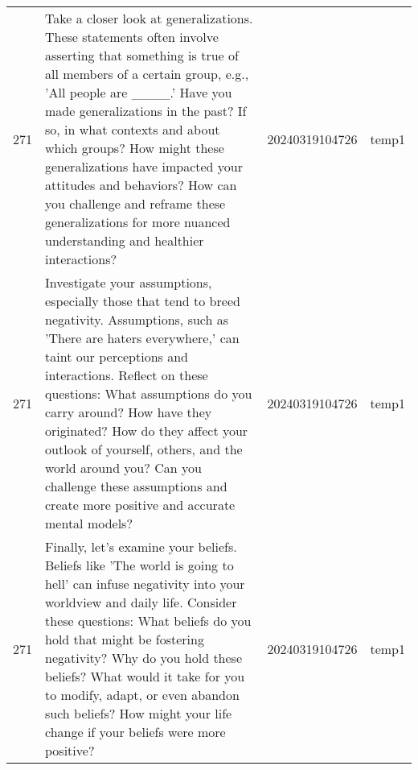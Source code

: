 \begin{longtable}{rlll}
271 &                                                                                                                                                                                                                                                                                                                                                                                                                                                                                                    Take a closer look at generalizations. These statements often involve asserting that something is true of all members of a certain group, e.g., 'All people are \_\_\_\_.' Have you made generalizations in the past? If so, in what contexts and about which groups? How might these generalizations have impacted your attitudes and behaviors? How can you challenge and reframe these generalizations for more nuanced understanding and healthier interactions? & 20240319104726 &       temp1 \\
271 &                                                                                                                                                                                                                                                                                                                                                                                                                                                                                                                   Investigate your assumptions, especially those that tend to breed negativity. Assumptions, such as 'There are haters everywhere,' can taint our perceptions and interactions. Reflect on these questions: What assumptions do you carry around? How have they originated? How do they affect your outlook of yourself, others, and the world around you? Can you challenge these assumptions and create more positive and accurate mental models? & 20240319104726 &       temp1 \\
271 &                                                                                                                                                                                                                                                                                                                                                                                                                                                                                                                                                            Finally, let's examine your beliefs. Beliefs like 'The world is going to hell' can infuse negativity into your worldview and daily life. Consider these questions: What beliefs do you hold that might be fostering negativity? Why do you hold these beliefs? What would it take for you to modify, adapt, or even abandon such beliefs? How might your life change if your beliefs were more positive? & 20240319104726 &       temp1 \\

\end{longtable}
